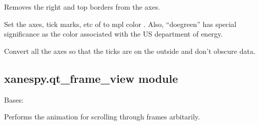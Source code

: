 \documentclass[letterpaper,10pt,english]{sphinxmanual}
\begin{document}

\begin{fulllineitems}
\label{\detokenize{xanespy:xanespy.plots.remove_extra_spines}}
Removes the right and top borders from the axes.

\end{fulllineitems}


\begin{fulllineitems}
\label{\detokenize{xanespy:xanespy.plots.set_axes_color}}
Set the axes, tick marks, etc of  to mpl color . Also,
“doegreen” has special significance as the color associated with the
US department of energy.

\end{fulllineitems}


\begin{fulllineitems}
\label{\detokenize{xanespy:xanespy.plots.set_outside_ticks}}
Convert all the axes so that the ticks are on the outside and don’t
obscure data.

\end{fulllineitems}



\subsection{xanespy.qt\_frame\_view module}
\label{\detokenize{xanespy:module-xanespy.qt_frame_view}}\label{\detokenize{xanespy:xanespy-qt-frame-view-module}}

\begin{fulllineitems}
\label{\detokenize{xanespy:xanespy.qt_frame_view.FrameAnimation}}
Bases: 

Performs the animation for scrolling through frames arbitarily.

\begin{fulllineitems}
\label{\detokenize{xanespy:xanespy.qt_frame_view.FrameAnimation.stop}}
\end{fulllineitems}


\end{fulllineitems}
\end{document}
